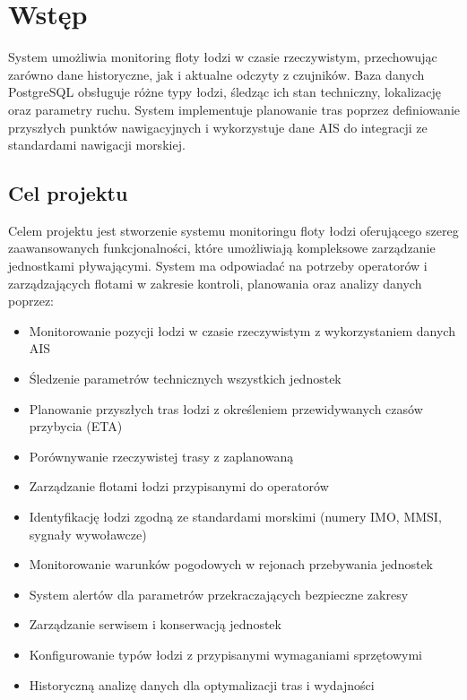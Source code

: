 \documentclass[12pt,a4paper,polish]{article}
\begin{document}
\pdfpageheight   297mm
\pdfpagewidth    210mm

\section{Wstęp}

System umożliwia monitoring floty łodzi w czasie rzeczywistym, przechowując zarówno dane historyczne, jak i aktualne odczyty z czujników. Baza danych PostgreSQL obsługuje różne typy łodzi, śledząc ich stan techniczny, lokalizację oraz parametry ruchu. System implementuje planowanie tras poprzez definiowanie przyszłych punktów nawigacyjnych i wykorzystuje dane AIS do integracji ze standardami nawigacji morskiej.

\subsection{Cel projektu}

Celem projektu jest stworzenie systemu monitoringu floty łodzi oferującego szereg zaawansowanych funkcjonalności, które umożliwiają kompleksowe zarządzanie jednostkami pływającymi. System ma odpowiadać na potrzeby operatorów i zarządzających flotami w zakresie kontroli, planowania oraz analizy danych poprzez:

\begin{itemize}
	\item Monitorowanie pozycji łodzi w czasie rzeczywistym z wykorzystaniem danych AIS
	\item Śledzenie parametrów technicznych wszystkich jednostek
	\item Planowanie przyszłych tras łodzi z określeniem przewidywanych czasów przybycia (ETA)
	\item Porównywanie rzeczywistej trasy z zaplanowaną
	\item Zarządzanie flotami łodzi przypisanymi do operatorów
	\item Identyfikację łodzi zgodną ze standardami morskimi (numery IMO, MMSI, sygnały wywoławcze)
	\item Monitorowanie warunków pogodowych w rejonach przebywania jednostek
	\item System alertów dla parametrów przekraczających bezpieczne zakresy
	\item Zarządzanie serwisem i konserwacją jednostek
	\item Konfigurowanie typów łodzi z przypisanymi wymaganiami sprzętowymi
	\item Historyczną analizę danych dla optymalizacji tras i wydajności
\end{itemize}
\end{document}
